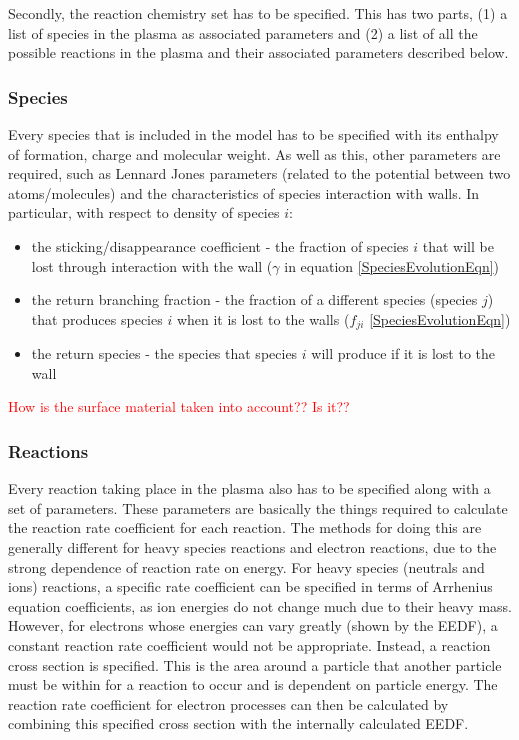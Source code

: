 \documentclass[11pt, oneside]{article}   	%
\begin{document}
Secondly, the reaction chemistry set has to be specified. 
This has two parts, (1) a list of species in the plasma as associated parameters and (2) a list of all the possible reactions in the plasma and their associated parameters described below.


\subsubsection*{Species}
Every species that is included in the model has to be specified with its enthalpy of formation, charge and molecular weight.
As well as this, other parameters are required, such as Lennard Jones parameters (related to the potential between two atoms/molecules) and the characteristics of species interaction with walls.
In particular, with respect to density of species $i$:
\begin{itemize}
\item the sticking/disappearance coefficient - the fraction of species $i$ that will be lost through interaction with the wall ($\gamma$ in equation \ref{SpeciesEvolutionEqn})
\item the return branching fraction - the fraction of a different species (species $j$) that produces species $i$ when it is lost to the walls ($f_{ji}$ \ref{SpeciesEvolutionEqn})
\item the return species - the species that species $i$ will produce if it is lost to the wall
\end{itemize}

\textcolor{red}{How is the surface material taken into account?? Is it??}


\subsubsection*{Reactions}
\label{Reactions}
Every reaction taking place in the plasma also has to be specified along with a set of parameters.
These parameters are basically the things required to calculate the reaction rate coefficient for each reaction.
The methods for doing this are generally different for heavy species reactions and electron reactions, due to the strong dependence of reaction rate on energy.
For heavy species (neutrals and ions) reactions, a specific rate coefficient can be specified in terms of Arrhenius equation coefficients, as ion energies do not change much due to their heavy mass.
However, for electrons whose energies can vary greatly (shown by the EEDF), a constant reaction rate coefficient would not be appropriate.
Instead, a reaction cross section is specified.
This is the area around a particle that another particle must be within for a reaction to occur and is dependent on particle energy.
The reaction rate coefficient for electron processes can then be calculated by combining this specified cross section with the internally calculated EEDF.
\end{document}
